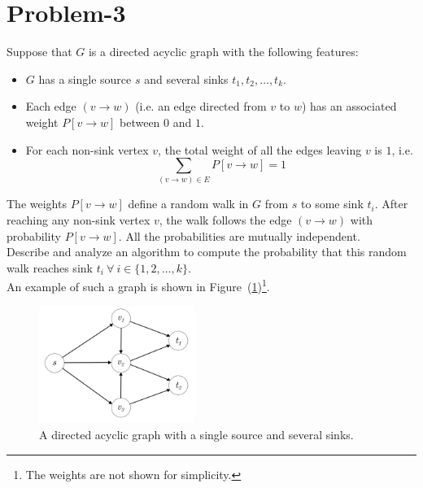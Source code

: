 \documentclass[12pt]{report}
\begin{document}
    \section*{\huge{Problem-3}}
    Suppose that $G$ is a directed acyclic graph with the following features:
    \begin{itemize}
        \item $G$ has a single source $s$ and several sinks $t_{1}, t_{2}, \dots, t_{k}$.
        \item Each edge $(v \to w)$ (i.e. an edge directed from $v$ to $w$) has an associated weight $P[v \to w]$ between $0$ and $1$.
        \item For each non-sink vertex $v$, the total weight of all the edges leaving $v$ is $1$, i.e.
        \begin{equation}
            \label{eq:total_weight}
            \sum_{(v \to w) \in E} P[v \to w] = 1
        \end{equation}
    \end{itemize}
    The weights $P[v \to w]$ define a random walk in $G$ from $s$ to some sink $t_{i}$.
    After reaching any non-sink vertex $v$, the walk follows the edge $(v \to w)$ with probability $P[v \to w]$.
    All the probabilities are mutually independent. \\
    Describe and analyze an algorithm to compute the probability that this random walk reaches sink
    $t_{i} \ \forall \ i \in \{ 1, 2, \dots, k \}$. \\
    An example of such a graph is shown in Figure~(\ref{fig:dag})\footnote{The weights are not shown for simplicity.}.

    \begin{figure}[htp]
        \begin{center}
            \includegraphics[width=0.45\textwidth]{dag.png}
        \end{center}
        \caption{A directed acyclic graph with a single source and several sinks.}
        \label{fig:dag}
    \end{figure}
\end{document}
